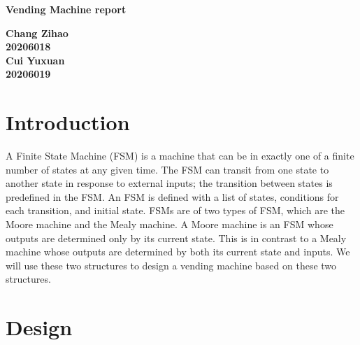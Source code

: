\documentclass[12pt,a4paper]{article}
\begin{document}
\begin{titlepage}
  \begin{center}
    \vspace*{1cm}

    \textbf{\Huge Vending Machine  report}

    \vspace{0.5cm}

         
    \vspace{1.5cm}

    \textbf{\large Chang Zihao \\20206018\\\large Cui Yuxuan\\20206019}

    \vfill
         

         
    \vspace{0.8cm}
  


         
\end{center}
\end{titlepage}


\newpage
\tableofcontents
\thispagestyle{empty}

\newpage
{}
\setcounter{page}{1}

\section{Introduction}

A Finite State Machine (FSM) is a machine that can be in exactly one of a finite number of states at any given time. 
The FSM can transit from one state to another state in response to external inputs; 
the transition between states is predefined in the FSM. 
An FSM is defined with a list of states, conditions for each transition, and initial state. 
FSMs are of two types of FSM, which are the Moore machine and the Mealy machine. 
A Moore machine is an FSM whose outputs are determined only by its current state. 
This is in contrast to a Mealy machine whose outputs are determined by both its current state and inputs. 
We will use these two structures to design a vending machine based on these two structures.

\newpage

\section{Design}
\end{document}
